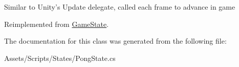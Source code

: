Similar to Unity's Update delegate, called each frame to advance in game 



Reimplemented from \hyperlink{class_game_state_ae89bf9e6ab333a6def5c7f231970622a}{Game\-State}.



The documentation for this class was generated from the following file\-:\begin{DoxyCompactItemize}
\item 
Assets/\-Scripts/\-States/Pong\-State.\-cs\end{DoxyCompactItemize}
